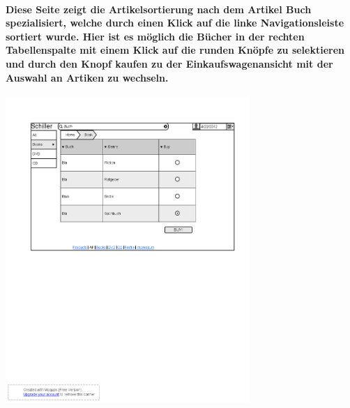 \documentclass[a4paper]{article}
\begin{document}
\paragraph{Diese Seite zeigt die Artikelsortierung nach dem Artikel Buch spezialisiert, welche durch einen Klick auf die linke Navigationsleiste sortiert wurde. Hier ist es möglich die Bücher in der rechten Tabellenspalte mit einem Klick auf die runden Knöpfe zu selektieren und durch den Knopf kaufen zu der Einkaufswagenansicht mit der Auswahl an Artiken zu wechseln.\\}
\includegraphics[width=350px]{7bookSearch.png}
\end{document}
